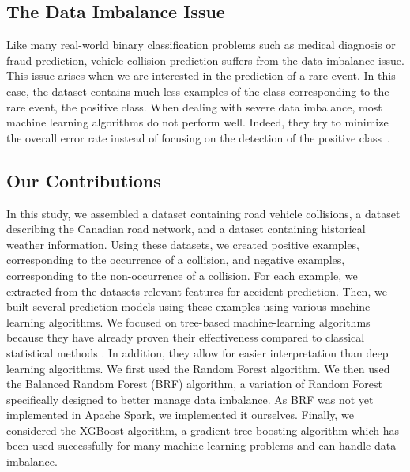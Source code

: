 \documentclass[conference]{IEEEtran}
\begin{document}
\subsection{The Data Imbalance Issue}

Like many real-world binary classification problems such as medical diagnosis or fraud prediction, vehicle collision prediction suffers from the data imbalance issue. This issue arises when we are interested in the prediction of a rare event. In this case, the dataset contains much less examples of the class corresponding to the rare event, the positive class. When dealing with severe data imbalance, most machine learning algorithms do not perform well. Indeed, they try to minimize the overall error rate instead of focusing on the detection of the positive class~\cite{Chen2004}.


\subsection{Our Contributions}

In this study, we assembled a dataset containing road vehicle collisions, a dataset describing the Canadian road network, and a dataset containing historical weather information. Using these datasets, we created positive examples, corresponding to the occurrence of a collision, and negative examples, corresponding to the non-occurrence of a collision. For each example, we extracted from the datasets relevant features for accident prediction. Then, we built several prediction models using these examples using various machine learning algorithms. 
We focused on tree-based machine-learning algorithms because they have already proven their effectiveness compared to classical statistical methods \cite{Chang2005, Chang2005b}. In addition, they allow for easier interpretation than deep learning algorithms. We first used the Random Forest algorithm\cite{Breiman2001}. 
We then used the Balanced Random Forest (BRF) algorithm\cite{Chen2004}, a variation of Random Forest specifically designed to better manage data imbalance. 
As BRF was not yet implemented in Apache Spark, we implemented it ourselves. Finally, we considered the XGBoost algorithm\cite{TChen2016}, a gradient tree boosting algorithm which has been used successfully for many machine learning problems and can handle data imbalance\cite{xgboost_doc}.
\end{document}
